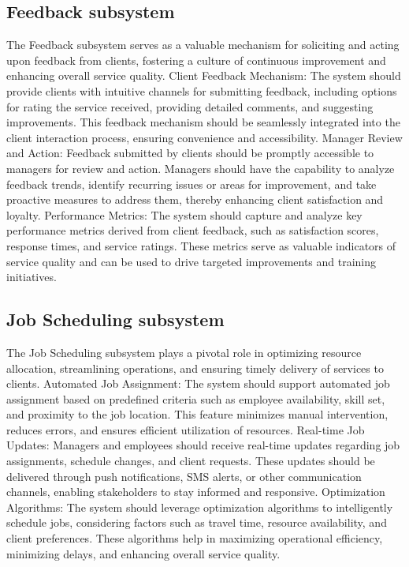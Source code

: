 \documentclass{article}
\begin{document}
	\subsection*{Feedback subsystem}	
	The Feedback subsystem serves as a valuable mechanism for soliciting and acting upon feedback from clients, fostering a culture of continuous improvement and enhancing overall service quality.
	Client Feedback Mechanism: The system should provide clients with intuitive channels for submitting feedback, including options for rating the service received, providing detailed comments, and suggesting improvements. This feedback mechanism should be seamlessly integrated into the client interaction process, ensuring convenience and accessibility.
	Manager Review and Action: Feedback submitted by clients should be promptly accessible to managers for review and action. Managers should have the capability to analyze feedback trends, identify recurring issues or areas for improvement, and take proactive measures to address them, thereby enhancing client satisfaction and loyalty.
	Performance Metrics: The system should capture and analyze key performance metrics derived from client feedback, such as satisfaction scores, response times, and service ratings. These metrics serve as valuable indicators of service quality and can be used to drive targeted improvements and training initiatives.

	\subsection*{Job Scheduling subsystem}
	The Job Scheduling subsystem plays a pivotal role in optimizing resource allocation, streamlining operations, and ensuring timely delivery of services to clients.
	Automated Job Assignment: The system should support automated job assignment based on predefined criteria such as employee availability, skill set, and proximity to the job location. This feature minimizes manual intervention, reduces errors, and ensures efficient utilization of resources.
	Real-time Job Updates: Managers and employees should receive real-time updates regarding job assignments, schedule changes, and client requests. These updates should be delivered through push notifications, SMS alerts, or other communication channels, enabling stakeholders to stay informed and responsive.
	Optimization Algorithms: The system should leverage optimization algorithms to intelligently schedule jobs, considering factors such as travel time, resource availability, and client preferences. These algorithms help in maximizing operational efficiency, minimizing delays, and enhancing overall service quality.
\end{document}
